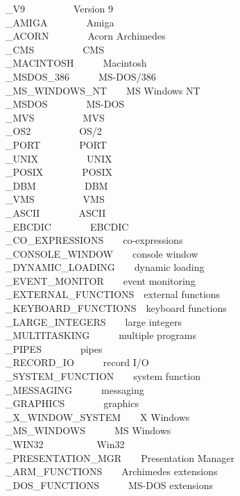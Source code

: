\_V9\ \ \ \ \ \ \ \ \ \ Version 9\\
\_AMIGA\ \ \ \ \ \ \ \ Amiga\\
\_ACORN\ \ \ \ \ \ \ \ Acorn Archimedes\\
\_CMS\ \ \ \ \ \ \ \ \ \ CMS\\
\_MACINTOSH\ \ \ \ \ \ Macintosh\\
\_MSDOS\_386\ \ \ \ \ \ MS-DOS/386\\
\_MS\_WINDOWS\_NT\ \ \ \ MS Windows NT\\
\_MSDOS\ \ \ \ \ \ \ \ MS-DOS\\
\_MVS\ \ \ \ \ \ \ \ \ \ MVS\\
\_OS2\ \ \ \ \ \ \ \ \ \ OS/2\\
\_PORT\ \ \ \ \ \ \ \ PORT\\
\_UNIX\ \ \ \ \ \ \ \ \ \ UNIX\\
\_POSIX\ \ \ \ \ \ \ \ POSIX\\
\_DBM\ \ \ \ \ \ \ \ \ \ DBM\\
\_VMS\ \ \ \ \ \ \ \ \ \ VMS\\
\_ASCII\ \ \ \ \ \ \ \ ASCII\\
\_EBCDIC\ \ \ \ \ \ \ \ EBCDIC\\
\_CO\_EXPRESSIONS\ \ \ \ co-expressions\\
\_CONSOLE\_WINDOW\ \ \ \ console window\\
\_DYNAMIC\_LOADING\ \ \ \ dynamic loading\\
\_EVENT\_MONITOR\ \ \ \ event monitoring\\
\_EXTERNAL\_FUNCTIONS\ \ external functions\\
\_KEYBOARD\_FUNCTIONS\ \ keyboard functions\\
\_LARGE\_INTEGERS\ \ \ \ large integers\\
\_MULTITASKING\ \ \ \ \ \ multiple programs\\
\_PIPES\ \ \ \ \ \ \ \ pipes\\
\_RECORD\_IO\ \ \ \ \ \ record I/O\\
\_SYSTEM\_FUNCTION\ \ \ \ system function\\
\_MESSAGING\ \ \ \ \ \ messaging\\
\_GRAPHICS\ \ \ \ \ \ \ \ graphics\\
\_X\_WINDOW\_SYSTEM\ \ \ \ X Windows\\
\_MS\_WINDOWS\ \ \ \ \ \ MS Windows\\
\_WIN32\ \ \ \ \ \ \ \ \ \ \ Win32\\
\_PRESENTATION\_MGR\ \ \ \ Presentation Manager\\
\_ARM\_FUNCTIONS\ \ \ \ Archimedes extensions\\
\_DOS\_FUNCTIONS\ \ \ \ \ \ MS-DOS extensions

